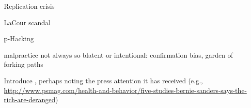 
Replication crisis

LaCour scandal

p-Hacking

malpractice not always so blatent or intentional: confirmation bias, garden of forking paths

Introduce \citet{Newman2015}, perhaps noting the press attention it has received (e.g., \url{http://www.psmag.com/health-and-behavior/five-studies-bernie-sanders-says-the-rich-are-deranged})

